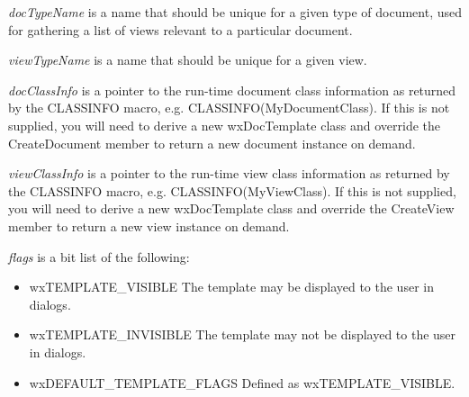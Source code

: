 {\it docTypeName} is a name that should be unique for a given type of document, used for
gathering a list of views relevant to a particular document.

{\it viewTypeName} is a name that should be unique for a given view.

{\it docClassInfo} is a pointer to the run-time document class information as returned
by the CLASSINFO macro, e.g. CLASSINFO(MyDocumentClass). If this is not supplied,
you will need to derive a new wxDocTemplate class and override the CreateDocument
member to return a new document instance on demand.

{\it viewClassInfo} is a pointer to the run-time view class information as returned
by the CLASSINFO macro, e.g. CLASSINFO(MyViewClass). If this is not supplied,
you will need to derive a new wxDocTemplate class and override the CreateView
member to return a new view instance on demand.

{\it flags} is a bit list of the following:

\begin{itemize}\itemsep=0pt
\item wxTEMPLATE\_VISIBLE The template may be displayed to the user in dialogs.
\item wxTEMPLATE\_INVISIBLE The template may not be displayed to the user in dialogs.
\item wxDEFAULT\_TEMPLATE\_FLAGS Defined as wxTEMPLATE\_VISIBLE.
\end{itemize}


